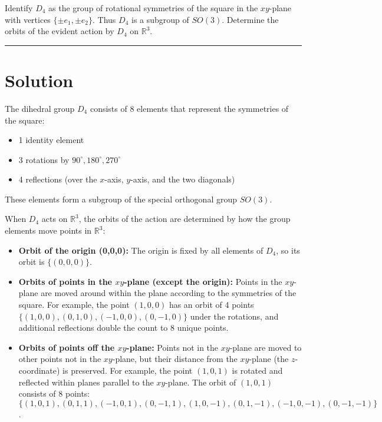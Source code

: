 \documentclass[12pt]{amsart}
\theoremstyle{definition}
\numberwithin{equation}{section}
\newcommand{\R}{\mathbb{R}}
\begin{document}
\begin{exercise}{3} Identify \(D_4\) as the group of rotational symmetries of the square in the \(xy\)-plane with vertices \(\{\pm e_1, \pm e_2\}\). Thus \(D_4\) is a subgroup of \(SO(3)\). Determine the orbits of the evident action by \(D_4\) on \(\R^3\).

    \noindent\rule{\linewidth}{1pt}

    \section*{Solution}

    The dihedral group \(D_4\) consists of 8 elements that represent the symmetries of the square:
    \begin{itemize}
        \item 1 identity element
        \item 3 rotations by \(90^\circ, 180^\circ, 270^\circ\)
        \item 4 reflections (over the \(x\)-axis, \(y\)-axis, and the two diagonals)
    \end{itemize}
    These elements form a subgroup of the special orthogonal group \(SO(3)\).

    When \(D_4\) acts on \(\mathbb{R}^3\), the orbits of the action are determined by how the group elements move points in \(\mathbb{R}^3\):
    \begin{itemize}
        \item \textbf{Orbit of the origin (0,0,0):} The origin is fixed by all elements of \(D_4\), so its orbit is \(\{(0,0,0)\}\).
        \item \textbf{Orbits of points in the \(xy\)-plane (except the origin):} Points in the \(xy\)-plane are moved around within the plane according to the symmetries of the square. For example, the point \((1,0,0)\) has an orbit of 4 points \(\{(1,0,0), (0,1,0), (-1,0,0), (0,-1,0)\}\) under the rotations, and additional reflections double the count to 8 unique points.
        \item \textbf{Orbits of points off the \(xy\)-plane:} Points not in the \(xy\)-plane are moved to other points not in the \(xy\)-plane, but their distance from the \(xy\)-plane (the \(z\)-coordinate) is preserved. For example, the point \((1,0,1)\) is rotated and reflected within planes parallel to the \(xy\)-plane. The orbit of \((1,0,1)\) consists of 8 points: \\ \(\{(1,0,1), (0,1,1), (-1,0,1), (0,-1,1), (1,0,-1), (0,1,-1), (-1,0,-1), (0,-1,-1)\}\).
    \end{itemize}
\end{exercise}
\newpage
\end{document}
